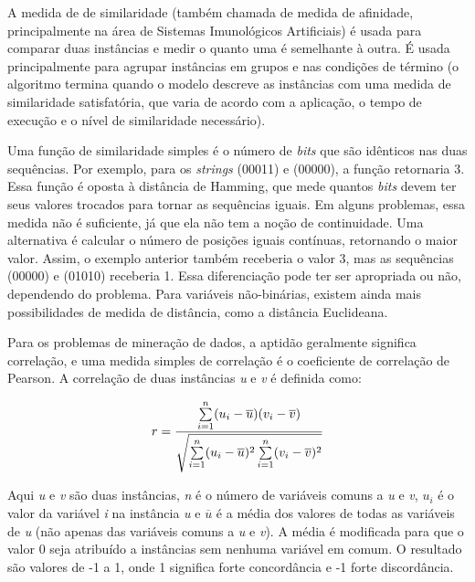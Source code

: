 A medida de de similaridade (também chamada de medida de afinidade, principalmente na área de Sistemas Imunológicos Artificiais) é usada para comparar duas instâncias e medir o quanto uma é semelhante à outra. É usada principalmente para agrupar instâncias em grupos e nas condições de término (o algoritmo termina quando o modelo descreve as instâncias com uma medida de similaridade satisfatória, que varia de acordo com a aplicação, o tempo de execução e o nível de similaridade necessário).

Uma função de similaridade simples é o número de \emph{bits} que são idênticos nas duas sequências. Por exemplo, para os \emph{strings} (00011) e (00000), a função retornaria 3. Essa função é oposta à distância de Hamming, que mede quantos \emph{bits} devem ter seus valores trocados para tornar as sequências iguais. Em alguns problemas, essa medida não é suficiente, já que ela não tem a noção de continuidade. Uma alternativa é calcular o número de posições iguais contínuas, retornando o maior valor. Assim, o exemplo anterior também receberia o valor 3, mas as sequências (00000) e (01010) receberia 1. Essa diferenciação pode ter ser apropriada ou não, dependendo do problema. Para variáveis não-binárias, existem ainda mais possibilidades de medida de distância, como a distância Euclideana.

Para os problemas de mineração de dados, a aptidão geralmente significa correlação, e uma medida simples de correlação é o coeficiente de correlação de Pearson. A correlação de duas instâncias \emph{u} e \emph{v} é definida como:

\begin{equation}
    \vspace{2mm}
r=\frac{
    \sum\limits_{i=1}^{n}
        (u_i-\overline{u})
        (v_i-\overline{v})
    }
    {\sqrt{
        \sum\limits_{i=1}^{n}
            (u_i-\overline{u})^2
        \sum\limits_{i=1}^{n}
            (v_i-\overline{v})^2
        }
    }
    \vspace{2mm}
\end{equation}

Aqui \emph{u} e \emph{v} são duas instâncias, \emph{n} é o número de variáveis comuns a \emph{u} e \emph{v}, \emph{$u_i$} é o valor da variável \emph{i} na instância \emph{u} e \emph{$\overline{u}$} é a média dos valores de todas as variáveis de \emph{u} (não apenas das variáveis comuns a \emph{u} e \emph{v}). A média é modificada para que o valor 0 seja atribuído a instâncias sem nenhuma variável em comum. O resultado são valores de -1 a 1, onde 1 significa forte concordância e -1 forte discordância.

